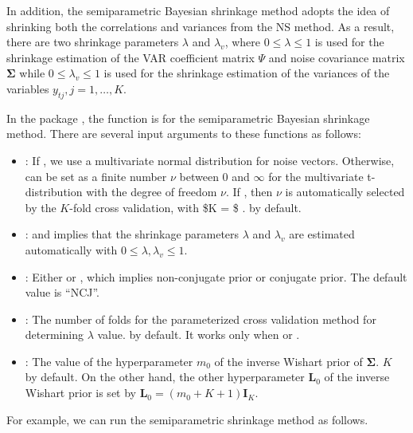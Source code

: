 \documentclass[
]{jss}
\providecommand{\tightlist}{%
  \setlength{\itemsep}{0pt}\setlength{\parskip}{0pt}}
\begin{document}
In addition, the semiparametric Bayesian shrinkage method adopts the
idea of shrinking both the correlations and variances from the NS
method. As a result, there are two shrinkage parameters \(\lambda\) and
\(\lambda_v\), where \(0 \leq \lambda \leq 1\) is used for the shrinkage
estimation of the VAR coefficient matrix \(\Psi\) and noise covariance
matrix \(\mathbf{\Sigma}\) while \(0 \leq \lambda_v \leq 1\) is used for
the shrinkage estimation of the variances of the variables
\(y_{tj}, j = 1, \ldots, K\).

In the package , the function
 is for the semiparametric
Bayesian shrinkage method. There are several input arguments to these
functions as follows:

\begin{itemize}
\tightlist
\item
  : If , we use a multivariate normal
  distribution for noise vectors. Otherwise,  can be set as a
  finite number \(\nu\) between \(0\) and \(\infty\) for the
  multivariate t-distribution with the degree of freedom \(\nu\). If
  , then \(\nu\) is automatically selected by the
  \(K\)-fold cross validation, with \$K = \$ .
   by default.
\item
  :  and
   implies that the shrinkage parameters
  \(\lambda\) and \(\lambda_v\) are estimated automatically with
  \(0\leq \lambda, \lambda_v \leq 1\).
\item
  : Either  or
  , which implies non-conjugate prior or
  conjugate prior. The default value is ``NCJ''.
\item
  : The number of folds for the parameterized cross
  validation method for determining \(\lambda\) value.
   by default. It works only when
   or .
\item
  : The value of the hyperparameter \(m_0\) of the inverse
  Wishart prior of \(\mathbf{\Sigma}\). \(K\) by default. On
  the other hand, the other hyperparameter \(\mathbf{L}_0\) of the
  inverse Wishart prior is set by
  \(\mathbf{L}_0 = (m_0 + K + 1) \mathbf{I}_K\).
\end{itemize}

For example, we can run the semiparametric shrinkage method as follows.
\end{document}
